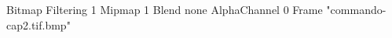 {Bitmap
	{Filtering 1}
	{Mipmap 1}
	{Blend none}
	{AlphaChannel 0}
	{Frame "commando-cap2.tif.bmp"}
}
